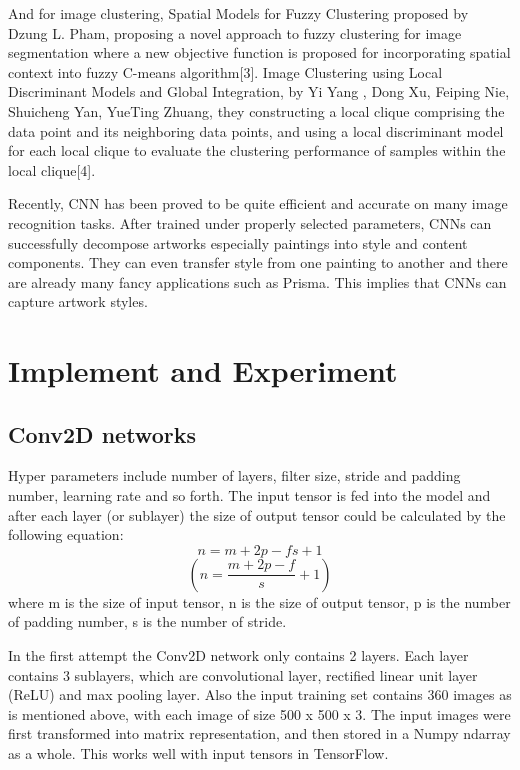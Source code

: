 \documentclass{article}
\begin{document}
And for image clustering, Spatial Models for Fuzzy Clustering proposed by Dzung L. Pham, proposing a novel approach to fuzzy clustering for image segmentation where a new objective function is proposed for incorporating spatial context into fuzzy C-means algorithm[3]. Image Clustering using Local Discriminant Models and Global Integration, by Yi Yang , Dong Xu, Feiping Nie, Shuicheng Yan, YueTing Zhuang, they constructing a local clique comprising the data point and its neighboring data points, and using a local discriminant model for each local clique to evaluate the clustering performance of samples within the local clique[4]. 

Recently, CNN has been proved to be quite efficient and accurate on many image recognition tasks. After trained under properly selected parameters, CNNs can successfully decompose artworks especially paintings into style and content components. They can even transfer style from one painting to another and there are already many fancy applications such as Prisma. This implies that CNNs can capture artwork styles.



\section{Implement and Experiment}

\subsection{Conv2D networks}

Hyper parameters include number of layers, filter size, stride and padding number, learning rate and so forth. The input tensor is fed into the model and after each layer (or sublayer) the size of output tensor could be calculated by the following equation:
$$n=m+2p-fs+1$$
$$(n = \frac{m+2p-f}{s} + 1)$$
where m is the size of input tensor, n is the size of output tensor, p is the number of padding number, s is the number of stride.

In the first attempt the Conv2D network only contains 2 layers. Each layer contains 3 sublayers, which are convolutional layer, rectified linear unit layer (ReLU) and max pooling layer. Also the input training set contains 360 images as is mentioned above, with each image of size 500 x 500 x 3. The input images were first transformed into matrix representation, and then stored in a Numpy ndarray as a whole. This works well with input tensors in TensorFlow.
\end{document}
